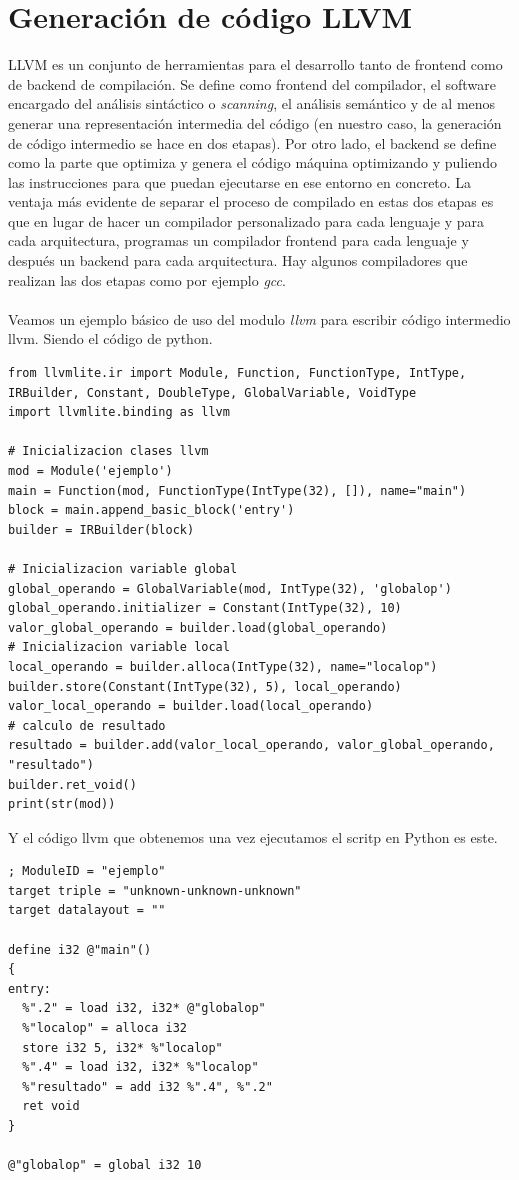 \section{Generación de código LLVM}
LLVM es un conjunto de herramientas para el desarrollo tanto de frontend como de backend de compilación. Se define como frontend del compilador, el software encargado del análisis sintáctico o \textit{scanning}, el análisis semántico y de al menos generar una representación intermedia del código (en nuestro caso, la generación de código intermedio se hace en dos etapas). Por otro lado, el backend se define como la parte que optimiza y genera el código máquina optimizando y puliendo las instrucciones para que puedan ejecutarse en ese entorno en concreto. La ventaja más evidente de separar el proceso de compilado en estas dos etapas es que en lugar de hacer un compilador personalizado para cada lenguaje y para cada arquitectura, programas un compilador frontend para cada lenguaje y después un backend para cada arquitectura. Hay algunos compiladores que realizan las dos etapas como por ejemplo \textit{gcc}.\\\\
Veamos un ejemplo básico de uso del modulo \textit{llvm} para escribir código intermedio llvm. Siendo el código de python.
\begin{lstlisting}[style=pythonStyle]
from llvmlite.ir import Module, Function, FunctionType, IntType, IRBuilder, Constant, DoubleType, GlobalVariable, VoidType
import llvmlite.binding as llvm

# Inicializacion clases llvm
mod = Module('ejemplo')
main = Function(mod, FunctionType(IntType(32), []), name="main")
block = main.append_basic_block('entry')
builder = IRBuilder(block)

# Inicializacion variable global
global_operando = GlobalVariable(mod, IntType(32), 'globalop')
global_operando.initializer = Constant(IntType(32), 10)
valor_global_operando = builder.load(global_operando)
# Inicializacion variable local
local_operando = builder.alloca(IntType(32), name="localop")
builder.store(Constant(IntType(32), 5), local_operando)
valor_local_operando = builder.load(local_operando)
# calculo de resultado
resultado = builder.add(valor_local_operando, valor_global_operando, "resultado")
builder.ret_void()
print(str(mod))
\end{lstlisting}
Y el código llvm que obtenemos una vez ejecutamos el scritp en Python es este.
\begin{lstlisting}[style=pythonStyle]
; ModuleID = "ejemplo"
target triple = "unknown-unknown-unknown"
target datalayout = ""

define i32 @"main"()
{
entry:
  %".2" = load i32, i32* @"globalop"
  %"localop" = alloca i32
  store i32 5, i32* %"localop"
  %".4" = load i32, i32* %"localop"
  %"resultado" = add i32 %".4", %".2"
  ret void
}

@"globalop" = global i32 10
\end{lstlisting}
